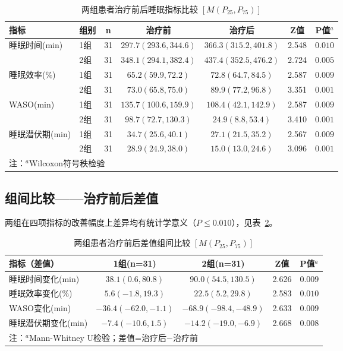 \documentclass[12pt,a4paper]{article}
\begin{document}
\begin{table}[H]
\centering
\caption{两组患者治疗前后睡眠指标比较 $[M(P_{25}, P_{75})]$}
\label{tab:pre_post}
\begin{tabular}{llccccc}
\toprule
\textbf{指标} & \textbf{组别} & \textbf{n} & \textbf{治疗前} & \textbf{治疗后} & \textbf{Z值} & \textbf{P值$^a$} \\
\midrule
\multirow{2}{*}{睡眠时间(min)} & 1组 & 31 & $297.7(293.6, 344.6)$ & $366.3(315.2, 401.8)$ & 2.548 & $0.010$ \\
 & 2组 & 31 & $348.1(294.1, 382.4)$ & $437.4(352.5, 476.2)$ & 2.724 & $0.005$ \\
\midrule
\multirow{2}{*}{睡眠效率(\%)} & 1组 & 31 & $65.2(59.9, 72.2)$ & $72.8(64.7, 84.5)$ & 2.587 & $0.009$ \\
 & 2组 & 31 & $73.0(65.8, 75.0)$ & $89.9(77.2, 96.8)$ & 3.351 & $0.001$ \\
\midrule
\multirow{2}{*}{WASO(min)} & 1组 & 31 & $135.7(100.6, 159.9)$ & $108.4(42.1, 142.9)$ & 2.587 & $0.009$ \\
 & 2组 & 31 & $98.7(72.7, 130.3)$ & $24.9(8.8, 53.4)$ & 3.410 & $0.001$ \\
\midrule
\multirow{2}{*}{睡眠潜伏期(min)} & 1组 & 31 & $34.7(25.6, 40.1)$ & $27.1(21.5, 35.2)$ & 2.567 & $0.009$ \\
 & 2组 & 31 & $28.9(24.9, 38.0)$ & $15.0(13.0, 24.6)$ & 3.096 & $0.001$ \\
\bottomrule
\multicolumn{7}{l}{\small 注：$^a$Wilcoxon符号秩检验} \\
\end{tabular}
\end{table}

\subsection{组间比较——治疗前后差值}

两组在四项指标的改善幅度上差异均有统计学意义（$P\leq 0.010$），见表~\ref{tab:diff}。

\begin{table}[H]
\centering
\caption{两组患者治疗前后差值组间比较 $[M(P_{25}, P_{75})]$}
\label{tab:diff}
\begin{tabular}{lcccl}
\toprule
\textbf{指标（差值）} & \textbf{1组(n=31)} & \textbf{2组(n=31)} & \textbf{Z值} & \textbf{P值$^a$} \\
\midrule
睡眠时间变化(min) & $38.1(0.6, 80.8)$ & $90.0(54.5, 130.5)$ & 2.626 & $0.009$ \\
睡眠效率变化(\%) & $5.6(-1.8, 19.3)$ & $22.5(5.2, 29.8)$ & 2.583 & $0.010$ \\
WASO变化(min) & $-36.4(-62.0, -1.1)$ & $-68.9(-98.4, -48.9)$ & 2.633 & $0.009$ \\
睡眠潜伏期变化(min) & $-7.4(-10.6, 1.5)$ & $-14.2(-19.0, -6.9)$ & 2.668 & $0.008$ \\
\bottomrule
\multicolumn{5}{l}{\small 注：$^a$Mann-Whitney U检验；差值=治疗后$-$治疗前} \\
\end{tabular}
\end{table}
\end{document}
